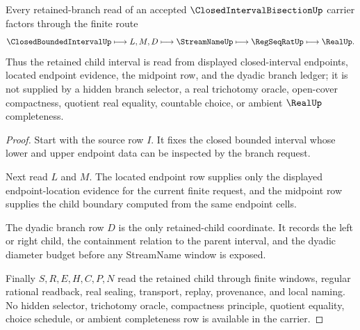 \begin{theorem}
\label{thm:closed-interval-bisection-branch-nonescape}
Every retained-branch read of an accepted $\ClosedIntervalBisectionUp$ carrier factors through the finite route
$$
\ClosedBoundedIntervalUp \longmapsto L,M,D \longmapsto \StreamNameUp \longmapsto \RegSeqRatUp \longmapsto \RealUp .
$$
Thus the retained child interval is read from displayed closed-interval endpoints, located endpoint evidence, the midpoint row, and the dyadic branch ledger; it is not supplied by a hidden branch selector, a real trichotomy oracle, open-cover compactness, quotient real equality, countable choice, or ambient $\RealUp$ completeness.
\end{theorem}
\begin{proof}
Start with the source row $I$. It fixes the closed bounded interval whose lower and upper endpoint data can be inspected by the branch request.

Next read $L$ and $M$. The located endpoint row supplies only the displayed endpoint-location evidence for the current finite request, and the midpoint row supplies the child boundary computed from the same endpoint cells.

The dyadic branch row $D$ is the only retained-child coordinate. It records the left or right child, the containment relation to the parent interval, and the dyadic diameter budget before any StreamName window is exposed.

Finally $S,R,E,H,C,P,N$ read the retained child through finite windows, regular rational readback, real sealing, transport, replay, provenance, and local naming. No hidden selector, trichotomy oracle, compactness principle, quotient equality, choice schedule, or ambient completeness row is available in the carrier.
\end{proof}

